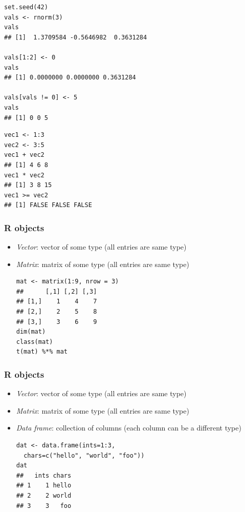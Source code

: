\documentclass[10pt,c]{beamer}
\newenvironment{changemargin}[1]{
  \begin{list}{}{
    \setlength{\topsep}{0pt}
    \setlength{\leftmargin}{#1}
    \setlength{\rightmargin}{#1}
    \setlength{\listparindent}{\parindent}
    \setlength{\itemindent}{\parindent}
    \setlength{\parsep}{\parskip}
  }
  \item[]}{\end{list}}
\begin{document}
\begin{frame}
\begin{changemargin}{-1.0em}
\begin{lstlisting}
set.seed(42)
vals <- rnorm(3)
vals
## [1]  1.3709584 -0.5646982  0.3631284

vals[1:2] <- 0
vals
## [1] 0.0000000 0.0000000 0.3631284

vals[vals != 0] <- 5
vals
## [1] 0 0 5
\end{lstlisting}
\end{changemargin}
\end{frame}
\begin{frame}
\begin{changemargin}{2.5em}
\begin{lstlisting}
vec1 <- 1:3
vec2 <- 3:5
vec1 + vec2
## [1] 4 6 8
vec1 * vec2
## [1] 3 8 15
vec1 >= vec2
## [1] FALSE FALSE FALSE
\end{lstlisting}
\end{changemargin}
\end{frame}
\begin{frame}[fragile]
\frametitle{R objects}
\begin{itemize}
\item \emph{Vector}: vector of some type (all entries are same type)
\item \emph{Matrix}: matrix of some type (all entries are same type)
\begin{lstlisting}
mat <- matrix(1:9, nrow = 3)
##      [,1] [,2] [,3]
## [1,]    1    4    7
## [2,]    2    5    8
## [3,]    3    6    9
dim(mat)
class(mat)
t(mat) %*% mat
\end{lstlisting}
\end{itemize}
\end{frame}
\begin{frame}[fragile]
\frametitle{R objects}
\begin{itemize}
\item \emph{Vector}: vector of some type (all entries are same type)
\item \emph{Matrix}: matrix of some type (all entries are same type)
\item \emph{Data frame}: collection of columns (each column can be a different type)
\begin{lstlisting}
dat <- data.frame(ints=1:3,
  chars=c("hello", "world", "foo"))
dat
##   ints chars
## 1    1 hello
## 2    2 world
## 3    3   foo
\end{lstlisting}
\end{itemize}
\end{frame}
\end{document}
